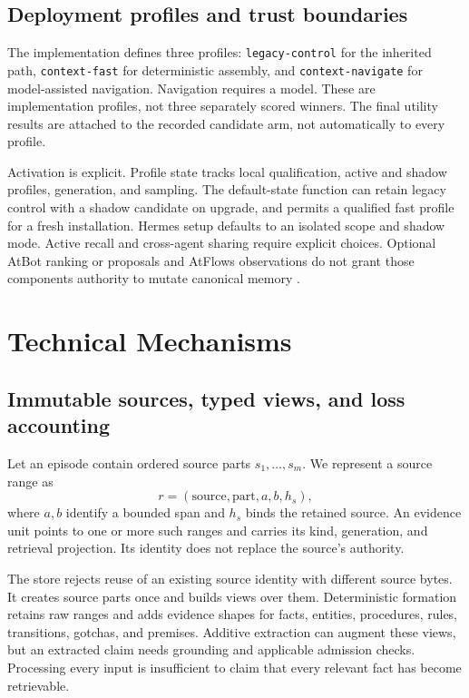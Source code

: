 \documentclass[10pt,twocolumn]{article}
\newcommand{\code}[1]{\texttt{\small #1}}
\begin{document}
\subsection{Deployment profiles and trust boundaries}
The implementation defines three profiles: \code{legacy-control} for the inherited path, \code{context-fast} for deterministic assembly, and \code{context-navigate} for model-assisted navigation. Navigation requires a model. These are implementation profiles, not three separately scored winners. The final utility results are attached to the recorded candidate arm, not automatically to every profile.

Activation is explicit. Profile state tracks local qualification, active and shadow profiles, generation, and sampling. The default-state function can retain legacy control with a shadow candidate on upgrade, and permits a qualified fast profile for a fresh installation. Hermes setup defaults to an isolated scope and shadow mode. Active recall and cross-agent sharing require explicit choices. Optional AtBot ranking or proposals and AtFlows observations do not grant those components authority to mutate canonical memory \citep{release}.

\section{Technical Mechanisms}
\label{sec:mechanisms}
\subsection{Immutable sources, typed views, and loss accounting}
Let an episode contain ordered source parts $s_1,\ldots,s_m$. We represent a source range as
\[
r=(\mathrm{source},\mathrm{part},a,b,h_s),
\]
where $a,b$ identify a bounded span and $h_s$ binds the retained source. An evidence unit points to one or more such ranges and carries its kind, generation, and retrieval projection. Its identity does not replace the source's authority.

The store rejects reuse of an existing source identity with different source bytes. It creates source parts once and builds views over them. Deterministic formation retains raw ranges and adds evidence shapes for facts, entities, procedures, rules, transitions, gotchas, and premises. Additive extraction can augment these views, but an extracted claim needs grounding and applicable admission checks. Processing every input is insufficient to claim that every relevant fact has become retrievable.
\end{document}
